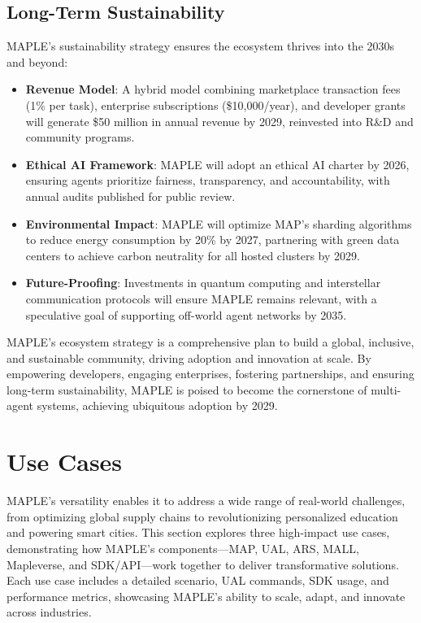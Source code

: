 \documentclass[a4paper,11pt]{article}
\begin{document}
\subsection{Long-Term Sustainability}
MAPLE’s sustainability strategy ensures the ecosystem thrives into the 2030s and beyond:
\begin{itemize}[leftmargin=*]
    \item \textbf{Revenue Model}: A hybrid model combining marketplace transaction fees (1\% per task), enterprise subscriptions (\$10,000/year), and developer grants will generate \$50 million in annual revenue by 2029, reinvested into R\&D and community programs.
    \item \textbf{Ethical AI Framework}: MAPLE will adopt an ethical AI charter by 2026, ensuring agents prioritize fairness, transparency, and accountability, with annual audits published for public review.
    \item \textbf{Environmental Impact}: MAPLE will optimize MAP’s sharding algorithms to reduce energy consumption by 20\% by 2027, partnering with green data centers to achieve carbon neutrality for all hosted clusters by 2029.
    \item \textbf{Future-Proofing}: Investments in quantum computing and interstellar communication protocols will ensure MAPLE remains relevant, with a speculative goal of supporting off-world agent networks by 2035.
\end{itemize}

MAPLE’s ecosystem strategy is a comprehensive plan to build a global, inclusive, and sustainable community, driving adoption and innovation at scale. By empowering developers, engaging enterprises, fostering partnerships, and ensuring long-term sustainability, MAPLE is poised to become the cornerstone of multi-agent systems, achieving ubiquitous adoption by 2029.

\pagebreak

\section{Use Cases}
MAPLE’s versatility enables it to address a wide range of real-world challenges, from optimizing global supply chains to revolutionizing personalized education and powering smart cities. This section explores three high-impact use cases, demonstrating how MAPLE’s components—MAP, UAL, ARS, MALL, Mapleverse, and SDK/API—work together to deliver transformative solutions. Each use case includes a detailed scenario, UAL commands, SDK usage, and performance metrics, showcasing MAPLE’s ability to scale, adapt, and innovate across industries.
\end{document}
